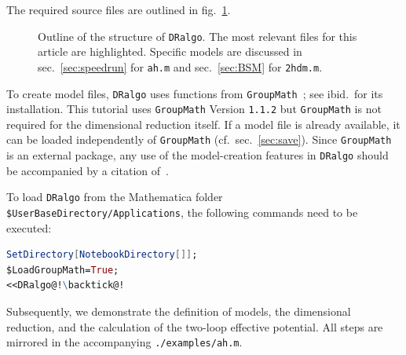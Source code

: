 \documentclass[11pt]{article}
\def\dralgo{{\tt DRalgo}}
\begin{document}
The required source files are outlined in fig.~\ref{fig:DirectoryTree}.
\begin{figure}[t]
\centering
{}
\caption{%
  Outline of the structure of \dralgo{}.
  The most relevant files for this article are highlighted.
  Specific models are discussed in
  sec.~\ref{sec:speedrun} for
  {\tt ah.m} and
  sec.~\ref{sec:BSM} for
  {\tt 2hdm.m}.
}
\label{fig:DirectoryTree}
\end{figure}
%
To create model files, \dralgo{} uses functions from
{\tt GroupMath}~\cite{Fonseca:2020vke};
see ibid.\ for its installation.
This tutorial uses {\tt GroupMath} Version {\tt 1.1.2} but
{\tt GroupMath} is not required for the dimensional reduction itself.
If a model file is already available,
it can be loaded independently of {\tt GroupMath} (cf.\ sec.~\ref{sec:save}).
Since {\tt GroupMath} is an external package, any use of
the model-creation features in \dralgo{} should be accompanied by
a citation of~\cite{Fonseca:2020vke}.

To load \dralgo{} from the Mathematica folder
{\verb!$UserBaseDirectory/Applications!},
the following commands need to be executed:
\begin{lstlisting}[language=Mathematica]
SetDirectory[NotebookDirectory[]];
$LoadGroupMath=True;
<<DRalgo@!\backtick@!
\end{lstlisting}
Subsequently, we demonstrate 
the definition of models,
the dimensional reduction, and
the calculation of the two-loop effective potential.
All steps are mirrored in the accompanying
{\tt ./examples/ah.m}.
\end{document}
